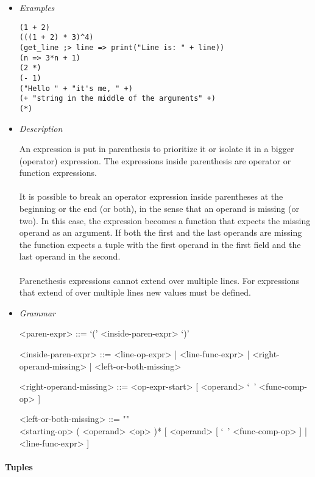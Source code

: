 \documentclass{article}
\begin{document}
\begin{itemize}

\item \textit{Examples}
\begin{verbatim}
(1 + 2)
(((1 + 2) * 3)^4)
(get_line ;> line => print("Line is: " + line))
(n => 3*n + 1)
(2 *)
(- 1)
("Hello " + "it's me, " +)
(+ "string in the middle of the arguments" +)
(*)
\end{verbatim}

\item \textit{Description}

An expression is put in parenthesis to prioritize it or isolate it in a bigger
(operator) expression. The expressions inside parenthesis are operator
or function expressions.
\\\\
It is possible to break an operator expression inside parentheses at the
beginning or the end (or both), in the sense that an operand is missing (or
two). In this case, the expression becomes a function that expects the missing
operand as an argument. If both the first and the last operands are missing 
the function expects a tuple with the first operand in the first field
and the last operand in the second.
\\\\
Parenethesis expressions cannot extend over multiple lines. For expressions
that extend of over multiple lines new values must be defined.

\item \textit{Grammar}
\begin{grammar}
<paren-expr> ::= `(' <inside-paren-expr> `)'  

<inside-paren-expr> ::= 
<line-op-expr> | <line-func-expr> | <right-operand-missing> | <left-or-both-missing>

<right-operand-missing> ::= <op-expr-start> [ <operand> `\ ' <func-comp-op> ]

<left-or-both-missing> ::= ""\\
<starting-op> ( <operand> <op> )*
[ <operand> [ `\ ' <func-comp-op> ] | <line-func-expr> ]
\end{grammar}

\end{itemize}

\paragraph{Tuples}
\end{document}
